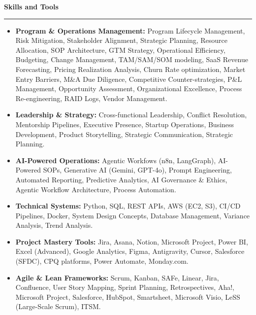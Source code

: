 \documentclass[9pt,letterpaper]{article} %
\newenvironment{rSection}[1]{ %
  \sectionskip
 \textbf{\Large #1} %
  \sectionlineskip
  \hrule %
  \begin{list}{}{ %
    \setlength{\leftmargin}{-0em} %
  }
  \item[]
}{
  \end{list}
}
\def\sectionlineskip{\smallskip} %
\def\sectionskip{} %
\begin{document}
\begin{rSection}{Skills and Tools}
\begin{itemize}[left=-1.5em, labelsep=.1cm, labelwidth=.2cm, itemsep=0.0em, topsep=0pt]
\item \textbf{Program \& Operations Management:} Program Lifecycle Management, Risk Mitigation, Stakeholder Alignment, Strategic Planning, Resource Allocation, SOP Architecture, GTM Strategy, Operational Efficiency, Budgeting, Change Management, TAM/SAM/SOM modeling, SaaS Revenue Forecasting, Pricing Realization Analysis, Churn Rate optimization, Market Entry Barriers, M\&A Due Diligence, Competitive Counter-strategies, P\&L Management, Opportunity Assessment, Organizational Excellence, Process Re-engineering, RAID Logs, Vendor Management.
\item \textbf{Leadership \& Strategy:} Cross-functional Leadership, Conflict Resolution, Mentorship Pipelines, Executive Presence, Startup Operations, Business Development, Product Storytelling, Strategic Communication, Strategic Planning.
\item \textbf{AI-Powered Operations:} Agentic Workfows (n8n, LangGraph), AI-Powered SOPs, Generative AI (Gemini, GPT-4o), Prompt Engineering, Automated Reporting, Predictive Analytics, AI Governance \& Ethics, Agentic Workflow Architecture, Process Automation.
\item \textbf{Technical Systems:} Python, SQL, REST APIs, AWS (EC2, S3), CI/CD Pipelines, Docker, System Design Concepts, Database Management, Variance Analysis, Trend Analysis.
\item \textbf{Project Mastery Tools:} Jira, Asana, Notion, Microsoft Project, Power BI, Excel (Advanced), Google Analytics, Figma, Antigravity, Cursor, Salesforce (SFDC), CPQ platforms, Power Automate, Monday.com.
\item \textbf{Agile \& Lean Frameworks:} Scrum, Kanban, SAFe, Linear, Jira, Confluence, User Story Mapping, Sprint Planning, Retrospectives, Aha!, Microsoft Project, Salesforce, HubSpot, Smartsheet, Microsoft Visio, LeSS (Large-Scale Scrum), ITSM.
\end{itemize}
\end{rSection}%
\end{document}
